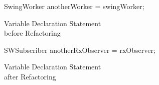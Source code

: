 \begin{figure}[H]
\begin{minipage}{0.48\textwidth}
\begin{sourcecode}
\begin{javacode}{}
SwingWorker anotherWorker = swingWorker;
\end{javacode}
\caption{Variable Declaration Statement\\before Refactoring}
\label{code:vds-before}
\end{sourcecode}
\end{minipage}\hspace{0.7cm}
\begin{minipage}{0.48\textwidth}
\begin{sourcecode}
\begin{javacode}{}
SWSubscriber anotherRxObserver = rxObserver;
\end{javacode}
\caption{Variable Declaration Statement\\after Refactoring}
\label{code:vds-after}
\end{sourcecode}
\end{minipage}
\end{figure}